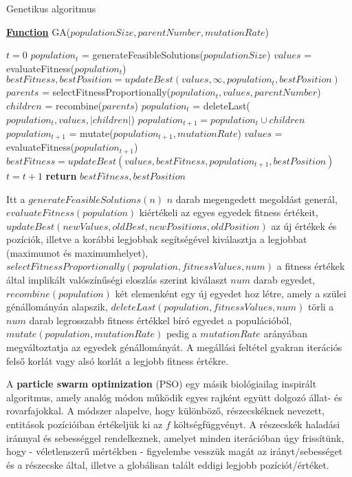 \begin{algorithm}[H]
\caption{Genetikus algoritmus}
\label{alg:ga} 
\textbf{\underline{Function}} GA($populationSize, parentNumber, mutationRate$)
\begin{algorithmic}[1] %
\STATE $t = 0$
\STATE $population_t$ = generateFeasibleSolutions($populationSize$)
\STATE $values$ = evaluateFitness($population_t$)
\STATE $bestFitness, bestPosition = updateBest(values, \infty, population_t, bestPosition)$
	\STATE $parents$ = selectFitnessProportionally($population_t, values, parentNumber$)
	\STATE $children$ = recombine($parents$)
	\STATE $population_t$ = deleteLast($population_t, values, |children|$)
	\STATE $population_{t+1} = population_t \cup children$
	\STATE $population_{t+1}$ = mutate($population_{t+1}, mutationRate$)
	\STATE $values$ = evaluateFitness($population_{t+1}$)
	\STATE $bestFitness = updateBest(values, bestFitness, population_{t+1}, bestPosition)$
	\STATE $t = t + 1$
\ENDWHILE
\STATE \textbf{return} $bestFitness, bestPosition$
\end{algorithmic}
\end{algorithm}


Itt a $generateFeasibleSolutions(n)$ $n$ darab megengedett megoldást generál, $evaluateFitness(population)$ kiértékeli az egyes egyedek fitness értékeit, $updateBest(newValues, oldBest, newPositions, oldPosition)$ az új értékek és pozíciók, illetve a korábbi legjobbak segítségével kiválasztja a legjobbat (maximumot és maximumhelyet), $selectFitnessProportionally(population, fitnessValues, num)$ a fitness értékek által implikált valószínűségi eloszlás szerint kiválaszt $num$ darab egyedet, $recombine(population)$ két elemenként egy új egyedet hoz létre, amely a szülei génállományán alapszik, $deleteLast(population, fitnessValues, num)$ törli a $num$ darab legrosszabb fitness értékkel bíró egyedet a populációból, $mutate(population, mutationRate)$ pedig a $mutationRate$ arányában megváltoztatja az egyedek génállományát. A megállási feltétel gyakran iterációs felső korlát vagy alsó korlát a legjobb fitness értékre.


A \textbf{particle swarm optimization} (PSO) egy másik biológiailag inspirált algoritmus, amely analóg módon működik egyes rajként együtt dolgozó állat- és rovarfajokkal\cite{non_gradient_optimization, pso, modified_pso}. A módszer alapelve, hogy különböző, részecskéknek nevezett, entitások pozícióiban értékeljük ki az $f$ költségfüggvényt. A részecskék haladási iránnyal és sebességgel rendelkeznek, amelyet minden iterációban úgy frissítünk, hogy - véletlenszerű mértékben - figyelembe vesszük magát az irányt/sebességet és a részecske által, illetve a globálisan talált eddigi legjobb pozíciót/értéket.

